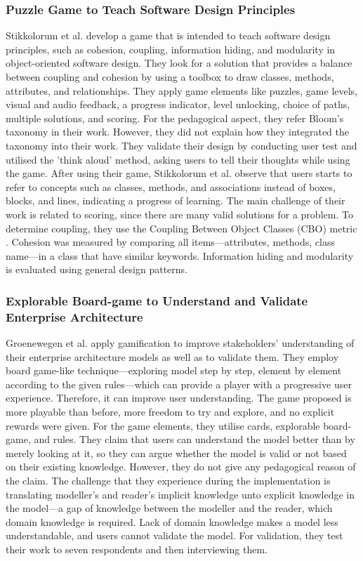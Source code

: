 \documentclass[12pt, a4paper]{report}
\begin{document}
{\subsubsection{Puzzle Game to Teach Software Design Principles}
Stikkolorum et al. \cite{Stikkolorum2014} develop a game that is intended to teach software design principles, such as cohesion, coupling, information hiding, and modularity in object-oriented software design. They look for a solution that provides a balance between coupling and cohesion by using a toolbox to draw classes, methods, attributes, and relationships. They apply game elements like puzzles, game levels, visual and audio feedback, a progress indicator, level unlocking, choice of paths, multiple solutions, and scoring. For the pedagogical aspect, they refer Bloom's taxonomy in their work. However, they did not explain how they integrated the taxonomy into their work. They validate their design by conducting user test and utilised the 'think aloud' method, asking users to tell their thoughts while using the game. After using their game, Stikkolorum et al. \cite{Stikkolorum2014} observe that users starts to refer to concepts such as classes, methods, and associations instead of boxes, blocks, and lines, indicating a progress of learning. The main  challenge of their work is related to scoring, since there are many valid solutions for a problem. To determine coupling, they use the Coupling Between Object Classes (CBO) metric \cite{Stikkolorum2014}. Cohesion was measured by comparing all items---attributes, methods, class name---in a class that have similar keywords. Information hiding and modularity is evaluated using general design patterns. 


\subsubsection{Explorable Board-game to Understand and Validate Enterprise Architecture}
Groenewegen et al. \cite{Groenewegen2010} apply gamification to improve stakeholders' understanding of their enterprise architecture models as well as to validate them. They employ board game-like technique---exploring model step by step, element by element according to the given rules---which can provide a player with a progressive user experience. Therefore, it can improve user understanding. The game proposed is more playable than before, more freedom to try and explore, and no explicit rewards were given. For the game elements, they utilise cards, explorable board-game, and rules. They claim that users can understand the model better than by merely looking at it, so they can argue whether the model is valid or not based on their existing knowledge. However, they do not give any pedagogical reason of the claim. The challenge that they experience during the implementation is translating modeller's and reader's implicit knowledge unto explicit knowledge in the model---a gap of knowledge between the modeller and the reader, which domain knowledge is required. Lack of domain knowledge makes a model less understandable, and users cannot validate the model. For validation, they test their work to seven respondents and then interviewing them. 

}
\end{document}
